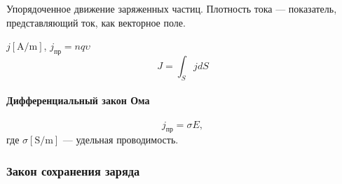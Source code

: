 \begin{definition}
	Упорядоченное движение заряженных частиц. Плотность тока --- показатель,
	представляющий ток, как векторное поле.

	$j\left[\unit{\ampere\per\meter}\right]$, $j_\text{пр} = nq \upsilon$
	\begin{equation*}
		J = \int_S j dS
	\end{equation*}
\end{definition}

\paragraph{Дифференциальный закон Ома}
\[
	j_\text{пр} = \sigma E
	,\]
где $\sigma [\unit{\siemens\per\meter}]$ --- удельная проводимость.

\subsubsection{Закон сохранения заряда}
